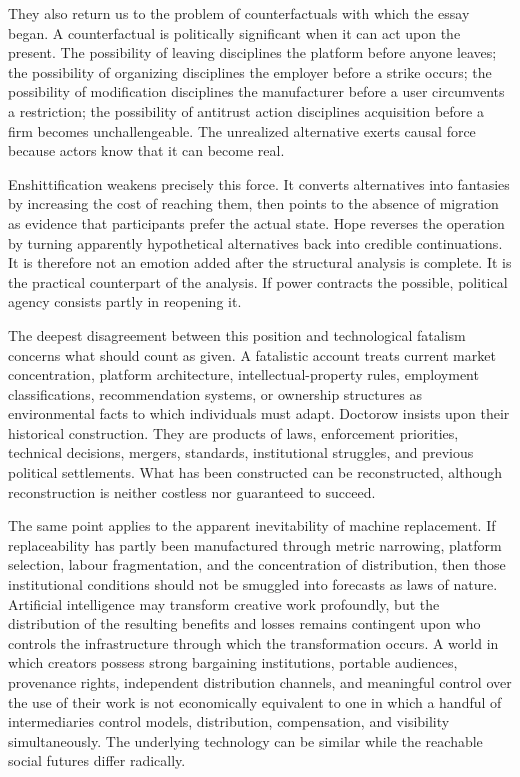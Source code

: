 \documentclass[11pt]{article}
\begin{document}
They also return us to the problem of counterfactuals with which the essay began. A counterfactual is politically significant when it can act upon the present. The possibility of leaving disciplines the platform before anyone leaves; the possibility of organizing disciplines the employer before a strike occurs; the possibility of modification disciplines the manufacturer before a user circumvents a restriction; the possibility of antitrust action disciplines acquisition before a firm becomes unchallengeable. The unrealized alternative exerts causal force because actors know that it can become real.

Enshittification weakens precisely this force. It converts alternatives into fantasies by increasing the cost of reaching them, then points to the absence of migration as evidence that participants prefer the actual state. Hope reverses the operation by turning apparently hypothetical alternatives back into credible continuations. It is therefore not an emotion added after the structural analysis is complete. It is the practical counterpart of the analysis. If power contracts the possible, political agency consists partly in reopening it.

The deepest disagreement between this position and technological fatalism concerns what should count as given. A fatalistic account treats current market concentration, platform architecture, intellectual-property rules, employment classifications, recommendation systems, or ownership structures as environmental facts to which individuals must adapt. Doctorow insists upon their historical construction. They are products of laws, enforcement priorities, technical decisions, mergers, standards, institutional struggles, and previous political settlements. What has been constructed can be reconstructed, although reconstruction is neither costless nor guaranteed to succeed.

The same point applies to the apparent inevitability of machine replacement. If replaceability has partly been manufactured through metric narrowing, platform selection, labour fragmentation, and the concentration of distribution, then those institutional conditions should not be smuggled into forecasts as laws of nature. Artificial intelligence may transform creative work profoundly, but the distribution of the resulting benefits and losses remains contingent upon who controls the infrastructure through which the transformation occurs. A world in which creators possess strong bargaining institutions, portable audiences, provenance rights, independent distribution channels, and meaningful control over the use of their work is not economically equivalent to one in which a handful of intermediaries control models, distribution, compensation, and visibility simultaneously. The underlying technology can be similar while the reachable social futures differ radically.
\end{document}
